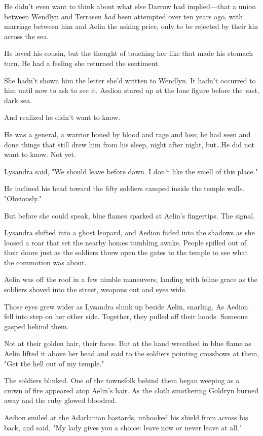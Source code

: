 He didn't even want to think about what else Darrow had implied---that a union between Wendlyn and Terrasen \emph{had} been attempted over ten years ago, with marriage between him and Aelin the asking price, only to be rejected by their kin across the sea.

He loved his cousin, but the thought of touching her like that made his stomach turn.
He had a feeling she returned the sentiment.

She hadn't shown him the letter she'd written to Wendlyn.
It hadn't occurred to him until now to ask to see it.
Aedion stared up at the lone figure before the vast, dark sea.

And realized he didn't want to know.

He was a general, a warrior honed by blood and rage and loss; he had seen and done things that still drew him from his sleep, night after night, but\ldots He did not want to know.
Not yet.

Lysandra said, "We should leave before dawn.
I don't like the smell of this place."

He inclined his head toward the fifty soldiers camped inside the temple walls.
"Obviously."

But before she could speak, blue flames sparked at Aelin's fingertips.
The signal.

Lysandra shifted into a ghost leopard, and Aedion faded into the shadows as she loosed a roar that set the nearby homes tumbling awake.
People spilled out of their doors just as the soldiers threw open the gates to the temple to see what the commotion was about.

Aelin was off the roof in a few nimble maneuvers, landing with feline grace as the soldiers shoved into the street, weapons out and eyes wide.

Those eyes grew wider as Lysandra slunk up beside Aelin, snarling.
As Aedion fell into step on her other side.
Together, they pulled off their hoods.
Someone gasped behind them.

Not at their golden hair, their faces.
But at the hand wreathed in blue flame as Aelin lifted it above her head and said to the soldiers pointing crossbows at them, "Get the hell out of my temple."

The soldiers blinked.
One of the townsfolk behind them began weeping as a crown of fire appeared atop Aelin's hair.
As the cloth smothering Goldryn burned away and the ruby glowed bloodred.

Aedion smiled at the Adarlanian bastards, unhooked his shield from across his back, and said, "My lady gives you a choice: leave now  or never leave at all."

